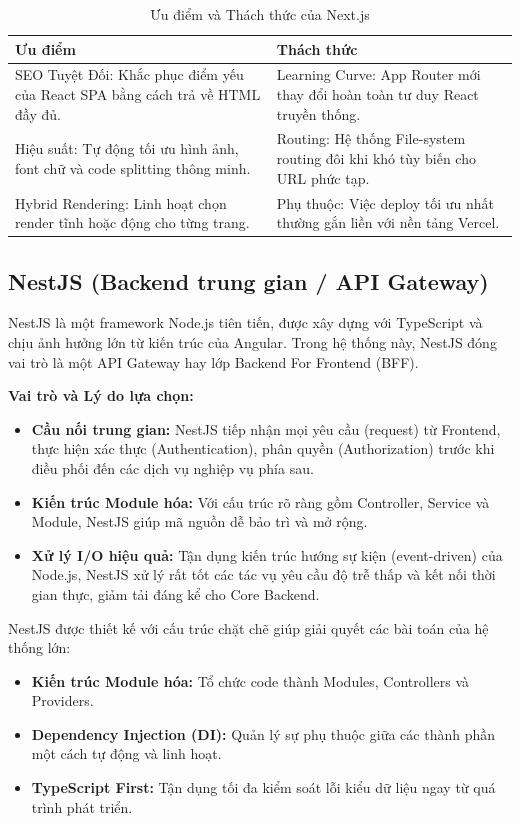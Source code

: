 \documentclass[12pt,a4paper]{report}
\begin{document}
\begin{table}[H]
\centering
\caption{Ưu điểm và Thách thức của Next.js}
\label{tab:nextjs_pros_cons}
\begin{tabularx}{\textwidth}{|X|X|}
\hline
\textbf{Ưu điểm} & \textbf{Thách thức} \\ \hline
SEO Tuyệt Đối: Khắc phục điểm yếu của React SPA bằng cách trả về HTML đầy đủ. & Learning Curve: App Router mới thay đổi hoàn toàn tư duy React truyền thống. \\ \hline
Hiệu suất: Tự động tối ưu hình ảnh, font chữ và code splitting thông minh. & Routing: Hệ thống File-system routing đôi khi khó tùy biến cho URL phức tạp. \\ \hline
Hybrid Rendering: Linh hoạt chọn render tĩnh hoặc động cho từng trang. & Phụ thuộc: Việc deploy tối ưu nhất thường gắn liền với nền tảng Vercel. \\ \hline
\end{tabularx}
\end{table}

\subsection{NestJS (Backend trung gian / API Gateway)}
NestJS là một framework Node.js tiên tiến, được xây dựng với TypeScript và chịu ảnh hưởng lớn từ kiến trúc của Angular. Trong hệ thống này, NestJS đóng vai trò là một API Gateway hay lớp Backend For Frontend (BFF).

\textbf{Vai trò và Lý do lựa chọn:}
\begin{itemize}
    \item \textbf{Cầu nối trung gian:} NestJS tiếp nhận mọi yêu cầu (request) từ Frontend, thực hiện xác thực (Authentication), phân quyền (Authorization) trước khi điều phối đến các dịch vụ nghiệp vụ phía sau.
    \item \textbf{Kiến trúc Module hóa:} Với cấu trúc rõ ràng gồm Controller, Service và Module, NestJS giúp mã nguồn dễ bảo trì và mở rộng.
    \item \textbf{Xử lý I/O hiệu quả:} Tận dụng kiến trúc hướng sự kiện (event-driven) của Node.js, NestJS xử lý rất tốt các tác vụ yêu cầu độ trễ thấp và kết nối thời gian thực, giảm tải đáng kể cho Core Backend.
\end{itemize}

NestJS được thiết kế với cấu trúc chặt chẽ giúp giải quyết các bài toán của hệ thống lớn:
\begin{itemize}
    \item \textbf{Kiến trúc Module hóa:} Tổ chức code thành Modules, Controllers và Providers.
    \item \textbf{Dependency Injection (DI):} Quản lý sự phụ thuộc giữa các thành phần một cách tự động và linh hoạt.
    \item \textbf{TypeScript First:} Tận dụng tối đa kiểm soát lỗi kiểu dữ liệu ngay từ quá trình phát triển.
\end{itemize}
\end{document}

